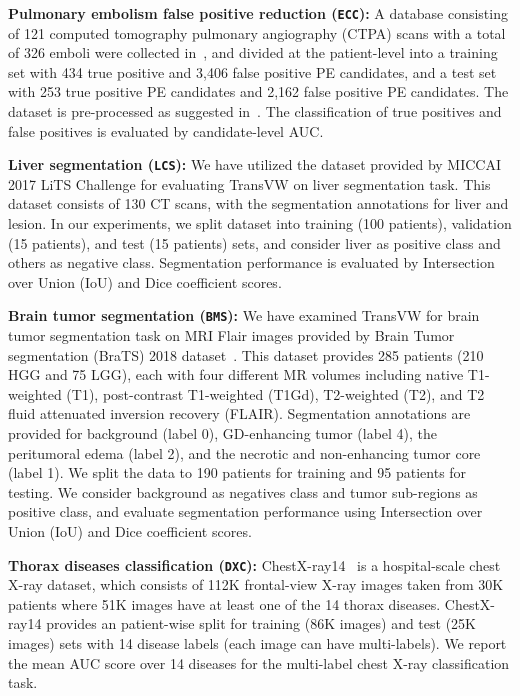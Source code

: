 \documentclass[journal,twoside,web]{ieeecolor}
\begin{document}
\smallskip
\noindent\textbf{Pulmonary embolism false positive reduction (\texttt{ECC}):} A database consisting of 121 computed tomography pulmonary angiography (CTPA) scans with a total of 326 emboli were collected in~\cite{tajbakhsh2015computer}, and divided at the patient-level into a training set with 434 true positive and 3,406 false positive PE candidates, and a test set with 253 true positive PE candidates and 2,162 false positive PE candidates.
The dataset is pre-processed as suggested in~\cite{zhou2019models}. The classification of true positives and false positives is evaluated by candidate-level AUC. 


\smallskip
\noindent\textbf{Liver segmentation (\texttt{LCS}):}
We have utilized the dataset provided by MICCAI 2017 LiTS Challenge for evaluating TransVW on liver segmentation task. This dataset
consists of 130 CT scans, with the segmentation annotations for liver and lesion.  In our experiments, we split dataset into training (100 patients), validation (15 patients), and test (15 patients) sets, and consider liver as positive class and others as negative class. Segmentation performance is evaluated by Intersection over Union (IoU) and Dice coefficient scores.


\smallskip
\noindent\textbf{Brain tumor segmentation (\texttt{BMS}):} 
We have examined TransVW for brain tumor segmentation task on MRI Flair images provided by Brain Tumor segmentation (BraTS) 2018 dataset~\cite{bakas2018identifying}. 
This dataset provides 285 patients (210 HGG and 75 LGG), each with four different MR volumes including native
T1-weighted (T1), post-contrast T1-weighted (T1Gd), T2-weighted (T2), and T2 fluid attenuated inversion recovery (FLAIR). Segmentation annotations are provided for 
background (label 0), GD-enhancing tumor (label 4), the peritumoral
edema (label 2), and the necrotic and non-enhancing tumor core (label 1).
We split the data to 190 patients for training and 95 patients for testing. We consider background as negatives class and tumor sub-regions as positive class, and evaluate segmentation performance using Intersection over Union (IoU) and Dice coefficient scores.


\smallskip
\noindent\textbf{Thorax diseases classification (\texttt{DXC}):}
ChestX-ray14~\cite{wang2017chestx} is a hospital-scale chest X-ray dataset, which consists of 112K frontal-view X-ray images taken from 30K patients where 51K images have at least one of the 14 thorax diseases. ChestX-ray14 provides an  patient-wise split for training (86K images) and test (25K images) sets with 14 disease labels (each image can have multi-labels). 
We report the mean AUC score over 14 diseases for the multi-label chest X-ray classification task.
\end{document}
